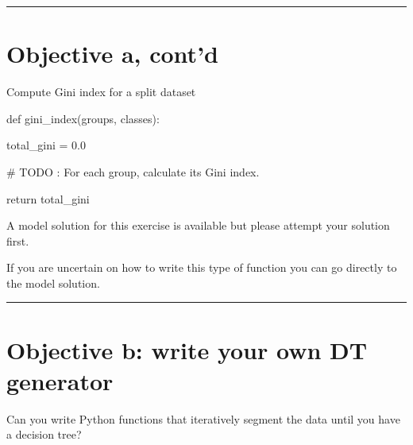 \documentclass[
  a4paper,
  DIV=11,
  numbers=noendperiod]{scrartcl}
\newenvironment{Shaded}{\begin{snugshade}}{\end{snugshade}}
\newcommand{\AlertTok}[1]{\textcolor[rgb]{0.68,0.00,0.00}{#1}}
\newcommand{\CommentTok}[1]{\textcolor[rgb]{0.37,0.37,0.37}{#1}}
\newcommand{\ControlFlowTok}[1]{\textcolor[rgb]{0.00,0.23,0.31}{#1}}
\newcommand{\FloatTok}[1]{\textcolor[rgb]{0.68,0.00,0.00}{#1}}
\newcommand{\KeywordTok}[1]{\textcolor[rgb]{0.00,0.23,0.31}{#1}}
\newcommand{\NormalTok}[1]{\textcolor[rgb]{0.00,0.23,0.31}{#1}}
\newcommand{\OperatorTok}[1]{\textcolor[rgb]{0.37,0.37,0.37}{#1}}
\begin{document}
\begin{center}\rule{0.5\linewidth}{0.5pt}\end{center}

\section{Objective a, cont'd}\label{objective-a-contd}

Compute Gini index for a split dataset

\begin{Shaded}
\begin{Highlighting}[]
\KeywordTok{def}\NormalTok{ gini\_index(groups, classes):}

\NormalTok{    total\_gini }\OperatorTok{=} \FloatTok{0.0}

    \CommentTok{\# }\AlertTok{TODO}\CommentTok{ : For each group, calculate its Gini index.}

    \ControlFlowTok{return}\NormalTok{ total\_gini}
\end{Highlighting}
\end{Shaded}

A model solution for this exercise is available but please attempt your
solution first.

If you are uncertain on how to write this type of function you can go
directly to the model solution.

\begin{center}\rule{0.5\linewidth}{0.5pt}\end{center}

\section{Objective b: write your own DT
generator}\label{objective-b-write-your-own-dt-generator}

Can you write Python functions that iteratively segment the data until
you have a decision tree?
\end{document}
